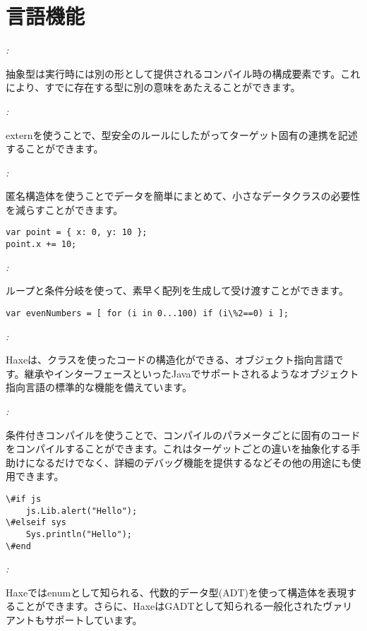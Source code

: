 \chapter{言語機能}
\label{lf}

\emph{:}

抽象型は実行時には別の形として提供されるコンパイル時の構成要素です。これにより、すでに存在する型に別の意味をあたえることができます。

\emph{:}

externを使うことで、型安全のルールにしたがってターゲット固有の連携を記述することができます。

\emph{:}

匿名構造体を使うことでデータを簡単にまとめて、小さなデータクラスの必要性を減らすことができます。

\begin{lstlisting}
var point = { x: 0, y: 10 };
point.x += 10;
\end{lstlisting}

\emph{:}

ループと条件分岐を使って、素早く配列を生成して受け渡すことができます。

\begin{lstlisting}
var evenNumbers = [ for (i in 0...100) if (i\%2==0) i ];
\end{lstlisting}

\emph{:}

Haxeは、クラスを使ったコードの構造化ができる、オブジェクト指向言語です。継承やインターフェースといったJavaでサポートされるようなオブジェクト指向言語の標準的な機能を備えています。

\emph{:}

条件付きコンパイルを使うことで、コンパイルのパラメータごとに固有のコードをコンパイルすることができます。これはターゲットごとの違いを抽象化する手助けになるだけでなく、詳細のデバッグ機能を提供するなどその他の用途にも使用できます。

\begin{lstlisting}
\#if js
    js.Lib.alert("Hello");
\#elseif sys
    Sys.println("Hello");
\#end
\end{lstlisting}

\emph{:}

Haxeではenumとして知られる、代数的データ型(ADT)を使って構造体を表現することができます。さらに、HaxeはGADTとして知られる一般化されたヴァリアントもサポートしています。

